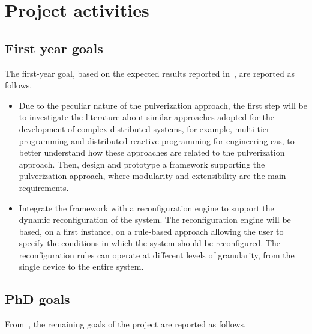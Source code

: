 \documentclass[12pt,a4paper]{article}
\begin{document}

\section{Project activities}\label{sec:activities}

\subsection{First year goals}\label{subsec:first-year-activities}

The first-year goal,
based on the expected results reported in~,
are reported as follows.

\begin{itemize}
	\item Due to the peculiar nature of the pulverization approach,
		the first step will be to investigate the literature about similar approaches adopted for the development of complex distributed systems,
		for example, multi-tier programming and distributed reactive programming for engineering \ac{cas},
		to better understand how these approaches are related to the pulverization approach.
		Then, design and prototype a framework supporting the pulverization approach,
		where modularity and extensibility are the main requirements.
	\item Integrate the framework with a reconfiguration engine to support the dynamic reconfiguration of the system.
	    The reconfiguration engine will be based,
		on a first instance,
		on a rule-based approach allowing the user to specify the conditions in which the system should be reconfigured.
	    The reconfiguration rules can operate at different levels of granularity,
	    from the single device to the entire system.
\end{itemize}

\subsection{PhD goals}\label{subsec:phd-activities}

From~,
the remaining goals of the project are reported as follows.
\end{document}
